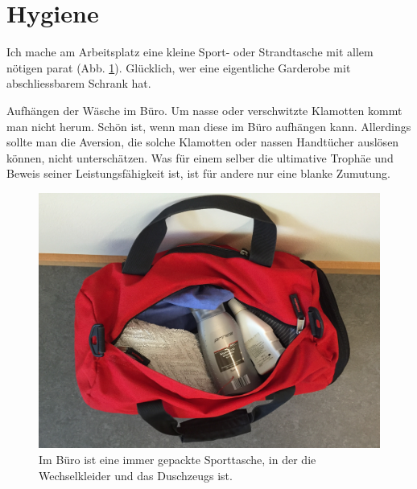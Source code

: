 \section{Hygiene}

Ich mache am Arbeitsplatz eine kleine Sport- oder Strandtasche mit allem nötigen parat (Abb. \ref{fig:sporttasche}).
Glücklich, wer eine eigentliche Garderobe mit abschliessbarem Schrank hat.

Aufhängen der Wäsche im Büro.
Um nasse oder verschwitzte Klamotten kommt man nicht herum.
Schön ist, wenn man diese im Büro aufhängen kann.
Allerdings sollte man die Aversion, die solche Klamotten oder nassen Handtücher auslösen können, nicht unterschätzen.
Was für einem selber die ultimative Trophäe und Beweis seiner Leistungsfähigkeit ist, ist für andere nur eine blanke Zumutung.

\begin{figure}[htpb]
        \centering
        \includegraphics[width=\textwidth]{figures/sporttasche-gepackt.jpg}
        \caption{Im Büro ist eine immer gepackte Sporttasche, in der die Wechselkleider und das Duschzeugs ist.}
        \label{fig:sporttasche}
\end{figure}
